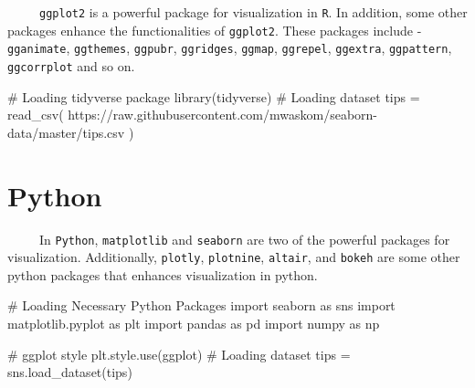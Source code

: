 \documentclass[
  letterpaper,
  DIV=11,
  numbers=noendperiod]{scrreprt}
\newenvironment{Shaded}{\begin{snugshade}}{\end{snugshade}}
\newcommand{\CommentTok}[1]{\textcolor[rgb]{0.37,0.37,0.37}{#1}}
\newcommand{\FunctionTok}[1]{\textcolor[rgb]{0.28,0.35,0.67}{#1}}
\newcommand{\ImportTok}[1]{\textcolor[rgb]{0.00,0.46,0.62}{#1}}
\newcommand{\NormalTok}[1]{\textcolor[rgb]{0.00,0.23,0.31}{#1}}
\newcommand{\OperatorTok}[1]{\textcolor[rgb]{0.37,0.37,0.37}{#1}}
\newcommand{\OtherTok}[1]{\textcolor[rgb]{0.00,0.23,0.31}{#1}}
\newcommand{\StringTok}[1]{\textcolor[rgb]{0.13,0.47,0.30}{#1}}
\begin{document}
~~~~~\texttt{ggplot2} is a powerful package for visualization in
\texttt{R}. In addition, some other packages enhance the functionalities
of \texttt{ggplot2}. These packages include - \texttt{gganimate},
\texttt{ggthemes}, \texttt{ggpubr}, \texttt{ggridges}, \texttt{ggmap},
\texttt{ggrepel}, \texttt{ggextra}, \texttt{ggpattern},
\texttt{ggcorrplot} and so on.

\begin{Shaded}
\begin{Highlighting}[]
\CommentTok{\# Loading tidyverse package}
\FunctionTok{library}\NormalTok{(tidyverse)}
\CommentTok{\# Loading dataset }
\NormalTok{tips }\OtherTok{=} \FunctionTok{read\_csv}\NormalTok{(}
    \StringTok{\textquotesingle{}https://raw.githubusercontent.com/mwaskom/seaborn{-}data/master/tips.csv\textquotesingle{}}
\NormalTok{)}
\end{Highlighting}
\end{Shaded}

\section{Python}

~~~~~In \texttt{Python}, \texttt{matplotlib} and \texttt{seaborn} are
two of the powerful packages for visualization. Additionally,
\texttt{plotly}, \texttt{plotnine}, \texttt{altair}, and \texttt{bokeh}
are some other python packages that enhances visualization in python.

\begin{Shaded}
\begin{Highlighting}[]
\CommentTok{\# Loading Necessary Python Packages }
\ImportTok{import}\NormalTok{ seaborn }\ImportTok{as}\NormalTok{ sns}
\ImportTok{import}\NormalTok{ matplotlib.pyplot }\ImportTok{as}\NormalTok{ plt}
\ImportTok{import}\NormalTok{ pandas }\ImportTok{as}\NormalTok{ pd}
\ImportTok{import}\NormalTok{ numpy }\ImportTok{as}\NormalTok{ np}
\end{Highlighting}
\end{Shaded}

\begin{Shaded}
\begin{Highlighting}[]
\CommentTok{\# ggplot style }
\NormalTok{plt.style.use(}\StringTok{\textquotesingle{}ggplot\textquotesingle{}}\NormalTok{)}
\CommentTok{\# Loading dataset}
\NormalTok{tips }\OperatorTok{=}\NormalTok{ sns.load\_dataset(}\StringTok{\textquotesingle{}tips\textquotesingle{}}\NormalTok{)}
\end{Highlighting}
\end{Shaded}
\end{document}
